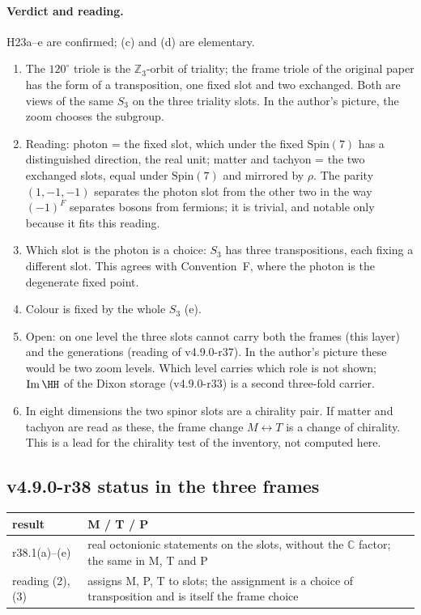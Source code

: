 \paragraph{Verdict and reading.}
H23a--e are confirmed; (c) and (d) are elementary.
\begin{enumerate}[leftmargin=2em]
\item The \(120^\circ\) triole is the \(\mathbb Z_3\)-orbit of triality; the frame triole of the original paper has the form of a
transposition, one fixed slot and two exchanged.  Both are views of the same \(S_3\) on the three triality slots.  In the author's
picture, the zoom chooses the subgroup.
\item Reading: photon = the fixed slot, which under the fixed \(\mathrm{Spin}(7)\) has a distinguished direction, the real unit;
matter and tachyon = the two exchanged slots, equal under \(\mathrm{Spin}(7)\) and mirrored by \(\rho\).  The parity \((1,-1,-1)\)
separates the photon slot from the other two in the way \((-1)^F\) separates bosons from fermions; it is trivial, and notable only
because it fits this reading.
\item Which slot is the photon is a choice: \(S_3\) has three transpositions, each fixing a different slot.  This agrees with
Convention~F, where the photon is the degenerate fixed point.
\item Colour is fixed by the whole \(S_3\) (e).
\item Open: on one level the three slots cannot carry both the frames (this layer) and the generations (reading of v4.9.0-r37).  In
the author's picture these would be two zoom levels.  Which level carries which role is not shown; \(\operatorname{Im}\HH\) of the
Dixon storage (v4.9.0-r33) is a second three-fold carrier.
\item In eight dimensions the two spinor slots are a chirality pair.  If matter and tachyon are read as these, the frame change
\(M\leftrightarrow T\) is a change of chirality.  This is a lead for the chirality test of the inventory, not computed here.
\end{enumerate}

\subsection*{v4.9.0-r38 status in the three frames}
\label{subsec:v490-r38-frames}

\begin{center}
\small
\begin{tabular}{@{}>{\raggedright\arraybackslash}p{}>{\raggedright\arraybackslash}p{}@{}}
\toprule
result & M / T / P\\
\midrule
r38.1(a)--(e) & real octonionic statements on the slots, without the \(\mathbb C\) factor; the same in M, T and P\\
reading (2), (3) & assigns M, P, T to slots; the assignment is a choice of transposition and is itself the frame choice\\
\bottomrule
\end{tabular}
\end{center}

